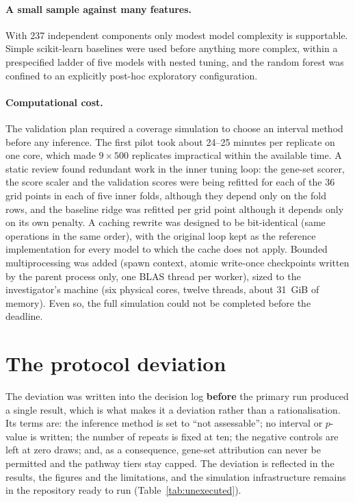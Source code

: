 \paragraph{A small sample against many features.} With 237 independent components only modest
model complexity is supportable. Simple scikit-learn baselines were used before anything more
complex, within a prespecified ladder of five models with nested tuning, and the random forest
was confined to an explicitly post-hoc exploratory configuration.

\paragraph{Computational cost.} The validation plan required a coverage simulation to choose an
interval method before any inference. The first pilot took about 24--25 minutes per replicate
on one core, which made $9\times500$ replicates impractical within the available time. A
static review found redundant work in the inner tuning loop: the gene-set scorer, the score
scaler and the validation scores were being refitted for each of the 36 grid points in each of
five inner folds, although they depend only on the fold rows, and the baseline ridge was
refitted per grid point although it depends only on its own penalty. A caching rewrite was
designed to be bit-identical (same operations in the same order), with the original loop kept
as the reference implementation for every model to which the cache does not apply. Bounded
multiprocessing was added (spawn context, atomic write-once checkpoints written by the parent
process only, one BLAS thread per worker), sized to the investigator's machine (six physical
cores, twelve threads, about 31~GiB of memory). Even so, the full simulation could not be
completed before the deadline.

\section{The protocol deviation}\label{sec:deviation}

The deviation was written into the decision log \textbf{before} the primary run produced a
single result, which is what makes it a deviation rather than a rationalisation. Its terms
are: the inference method is set to \enquote{not assessable}; no interval or $p$-value is
written; the number of repeats is fixed at ten; the negative controls are left at zero draws;
and, as a consequence, gene-set attribution can never be permitted and the pathway tiers stay
capped. The deviation is reflected in the results, the figures and the limitations, and the
simulation infrastructure remains in the repository ready to run (Table~\ref{tab:unexecuted}).

